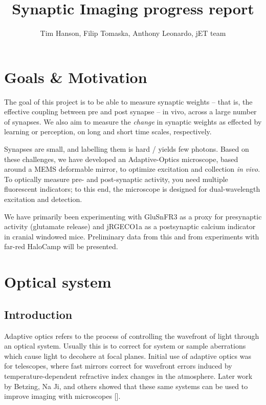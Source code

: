 \documentclass[a4paper,12pt]{article}
\title{Synaptic Imaging progress report}
\author{Tim Hanson, Filip Tomaska, Anthony Leonardo, jET team}
\begin{document}
\maketitle

\begin{abstract}

\end{abstract}

\section{Goals \& Motivation}

The goal of this project is to be able to measure synaptic weights -- that is, the effective coupling between pre and post synapse -- in vivo, across a large number of synapses.  We also aim to measure the \textit{change} in synaptic weights as effected by learning or perception, on long and short time scales, respectively.  

Synapses are small, and labelling them is hard / yields few photons.  Based on these challenges, we have developed an Adaptive-Optics microscope, based around a MEMS deformable mirror, to optimize excitation and collection \textit{in vivo}.  To optically measure pre- and post-synaptic activity, you need multiple fluorescent indicators; to this end, the microscope is designed for dual-wavelength excitation and detection.  

We have primarily been experimenting with GluSnFR3 as a proxy for presynaptic activity (glutamate release) and jRGECO1a as a postsynaptic calcium indicator in cranial windowed mice.  Preliminary data from this and from experiments with far-red HaloCamp will be presented.  

\section{Optical system}

\subsection{Introduction}

Adaptive optics refers to the process of controlling the wavefront of light through an optical system.  Usually this is to correct for system or sample aberrations which cause light to decohere at focal planes.  Initial use of adaptive optics was for telescopes, where fast mirrors correct for wavefront errors induced by temperature-dependent refractive index changes in the atmosphere.  Later work by Betzing, Na Ji, and others showed that these same systems can be used to improve imaging with microscopes [].  
\end{document}
